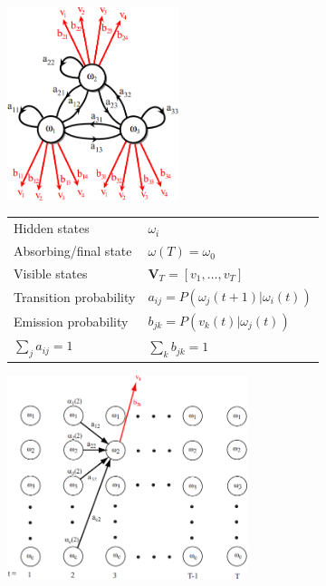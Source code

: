   \begin{minipage}{8cm}
	\hspace{1cm}
    \includegraphics[width=5cm]{./images/hiddenMarkovModel.png}
    
    \begin{tabular}{ll}
      Hidden states              &$\omega_i$\\
      Absorbing/final state      &$\omega(T) = \omega_0$\\
      Visible states             &$\bm V_T = [v_1, \ldots, v_T]$\\
      Transition probability     &$a_{ij} = P(\omega_j(t+1) | \omega_i(t))$\\
      Emission probability       &$b_{jk} = P(v_k(t) | \omega_j(t))$\\
      $\sum\limits_j a_{ij} = 1$ &$\sum\limits_k b_{jk} = 1$\\
    \end{tabular}
    
    \includegraphics[width=7cm]{./images/hiddenMarkovModel2.png}
  \end{minipage}
  
